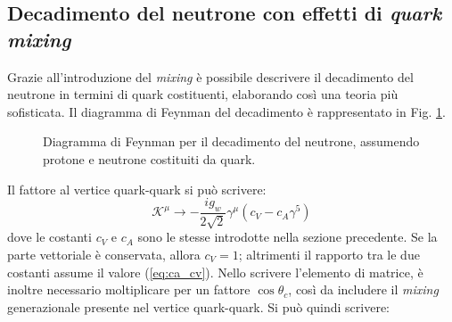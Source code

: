 \documentclass{subnucbo}
\begin{document}
\subsection{Decadimento del neutrone con effetti di \textit{quark mixing}}
Grazie all'introduzione del \textit{mixing} è possibile descrivere il decadimento del neutrone in termini di quark costituenti, elaborando così una teoria più sofisticata. Il diagramma di Feynman del decadimento è rappresentato in Fig. \ref{fig:neutron_decay_quarks}.
\begin{figure}[!h]
        \centering
        \caption{Diagramma di Feynman per il decadimento del neutrone, assumendo protone e neutrone costituiti da quark.}
        \label{fig:neutron_decay_quarks}
\end{figure}
Il fattore al vertice quark-quark si può scrivere:
\begin{equation}
        \mathcal { K } ^ { \mu } \rightarrow - \frac { i g _ { w } } { 2 \sqrt { 2 } } \gamma ^ { \mu } \left( c _ { V } - c _ { A } \gamma ^ { 5 } \right)
\end{equation}
dove le costanti $c_{V}$ e $c_{A}$ sono le stesse introdotte nella sezione precedente. Se la parte vettoriale è conservata, allora $c_{V} = 1$; altrimenti il rapporto tra le due costanti assume il valore (\ref{eq:ca_cv}). Nello scrivere l'elemento di matrice, è inoltre necessario moltiplicare per un fattore $\cos\theta_{c}$, così da includere il \textit{mixing} generazionale presente nel vertice quark-quark. Si può quindi scrivere:
\end{document}

